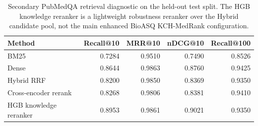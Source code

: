 \begin{table}[t]
\centering
\small
\caption{Secondary PubMedQA retrieval diagnostic on the held-out test split. The HGB knowledge reranker is a lightweight robustness reranker over the Hybrid candidate pool, not the main enhanced BioASQ KCH-MedRank configuration.}
\label{tab:pubmedqa-retrieval-diagnostic}
\begin{tabular}{lrrrr}
\toprule
Method & Recall@10 & MRR@10 & nDCG@10 & Recall@100 \\
\midrule
BM25 & 0.7284 & 0.9510 & 0.7490 & 0.8526 \\
Dense & 0.8644 & 0.9863 & 0.8760 & 0.9425 \\
Hybrid RRF & 0.8200 & 0.9850 & 0.8369 & 0.9350 \\
Cross-encoder rerank & 0.8268 & 0.9806 & 0.8381 & 0.9410 \\
HGB knowledge reranker & 0.8953 & 0.9861 & 0.9021 & 0.9350 \\
\bottomrule
\end{tabular}
\end{table}
